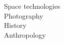 \documentclass[9pt]{developercv} %
\begin{document}
\begin{minipage}[t]{0.18\textwidth}
		Space technologies\\
		Photography\\
		History\\
		Anthropology
\end{minipage}

\end{document}
